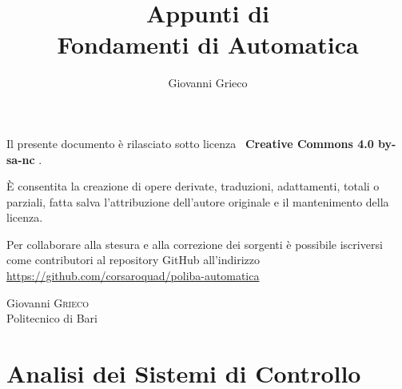 \documentclass[10pt,a4paper,onecolumn,titlepage,twoside,openright,final]{book}
\title{Appunti di \\ Fondamenti di Automatica}
\subtitle{}
\author{Giovanni Grieco}
\begin{document}

\frontmatter
\maketitle
\newpage

\null
\vfill
Il presente documento è rilasciato sotto licenza \ccLogo\  \textbf{Creative Commons 4.0 by-sa-nc} \ccbyncsa.

È consentita la creazione di opere derivate, traduzioni, adattamenti, totali o parziali,
fatta salva l'attribuzione dell'autore originale e il mantenimento della licenza.

Per collaborare alla stesura e alla correzione dei sorgenti è possibile iscriversi
come contributori al repository GitHub all'indirizzo \url{https://github.com/corsaroquad/poliba-automatica}

Giovanni \textsc{Grieco}\\Politecnico di Bari
\cleardoublepage\clearpage{\pagestyle{empty}\cleardoublepage}

\tableofcontents

\mainmatter
\part{Analisi dei Sistemi di Controllo}



\end{document}
